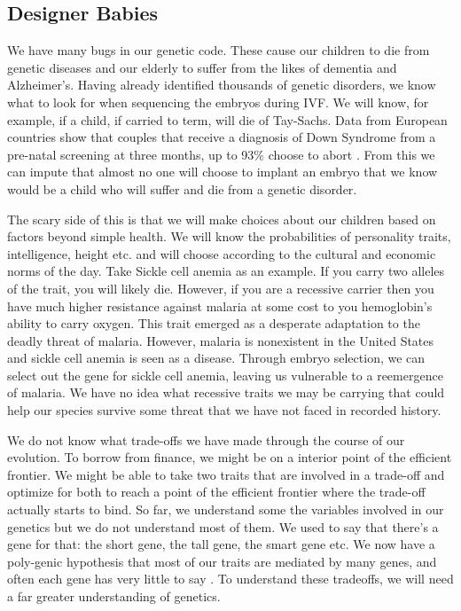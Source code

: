 \subsection{Designer Babies}

We have many bugs in our genetic code.
These cause our children to die from genetic diseases and our elderly to suffer from the likes of dementia and Alzheimer's.
Having already identified thousands of genetic disorders, we know what to look for when sequencing the embryos during IVF.
We will know, for example, if a child, if carried to term, will die of Tay-Sachs.
Data from European countries show that couples that receive a diagnosis of Down Syndrome from a pre-natal screening at three months, up to 93\% choose to abort \cite{Natoli2012}.
From this we can impute that almost no one will choose to implant an embryo that we know would be a child who will suffer and die from a genetic disorder.

The scary side of this is that we will make choices about our children based on factors beyond simple health.
We will know the probabilities of personality traits, intelligence, height etc. and will choose according to the cultural and economic norms of the day.
Take Sickle cell anemia as an example.
If you carry two alleles of the trait, you will likely die.
However, if you are a recessive carrier then you have much higher resistance against malaria at some cost to you hemoglobin's ability to carry oxygen.
This trait emerged as a desperate adaptation to the deadly threat of malaria.
However, malaria is nonexistent in the United States and sickle cell anemia is seen as a disease.
Through embryo selection, we can select out the gene for sickle cell anemia, leaving us vulnerable to a reemergence of malaria.
We have no idea what recessive traits we may be carrying that could help our species survive some threat that we have not faced in recorded history.

We do not know what trade-offs we have made through the course of our evolution.
To borrow from finance, we might be on a interior point of the efficient frontier.
We might be able to take two traits that are involved in a trade-off and optimize for both to reach a point of the efficient frontier where the trade-off actually starts to bind.
So far, we understand some the variables involved in our genetics but we do not understand most of them.
We used to say that there's a gene for that: the short gene, the tall gene, the smart gene etc.
We now have a poly-genic hypothesis that most of our traits are mediated by many genes, and often each gene has very little to say \cite{polygenic2016}.
To understand these tradeoffs, we will need a far greater understanding of genetics.

